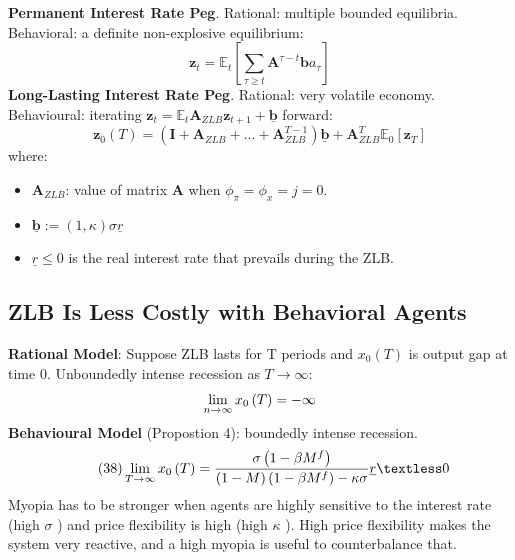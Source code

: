 \documentclass{beamer}
\begin{document}
\begin{frame}{\subsecname}
    \textbf{Permanent Interest Rate Peg}. Rational: multiple bounded equilibria. Behavioral: a definite non-explosive equilibrium:
    \begin{equation}\tag{36}
        \textbf{z}_{t}=\mathbb{E}_{t}\left[\sum_{\tau \geq t}\textbf{A}^{\tau-t}\textbf{b}a_{\tau}\right]
    \end{equation}
    \textbf{Long-Lasting Interest Rate Peg}. Rational: very volatile economy. Behavioural: iterating $\textbf{z}_{t}=\mathbb{E}_{t}\textbf{A}_{ZLB}\textbf{z}_{t+1}+\underline{\textbf{b}}$ forward:
    \begin{equation}\tag{37}
        \textbf{z}_{0}(T)=\left(\textbf{I}+\textbf{A}_{ZLB}+...+\textbf{A}_{ZLB}^{T-1}\right)\underline{\textbf{b}}+\textbf{A}_{ZLB}^{T}\mathbb{E}_{0}\left[\textbf{z}_{T}\right]
    \end{equation}
    where:
    \begin{itemize}
        \item $\textbf{A}_{ZLB}$: value of matrix $\textbf{A}$  when $\phi_{\pi}=\phi_{x}=j=0$.
        \item $\underline{\textbf{b}}:=\left(1,\kappa\right)\sigma\underline{r}$
        \item $\underline{r}\leq 0$ is the real interest rate that prevails during the ZLB.
    \end{itemize}
\end{frame}

\subsection{ZLB Is Less Costly with Behavioral Agents}

\begin{frame}{\subsecname}
    \textbf{Rational Model}: Suppose ZLB lasts for T periods and $x_{0}\left(T\right)$ is output gap at time 0. Unboundedly intense recession as $T\to\infty$:
    \begin{equation}\notag
        \lim\limits_{n\to\infty}x_{0}\left(T\right)=-\infty
    \end{equation}
    \textbf{Behavioural Model} (Propostion 4): boundedly intense recession.
    \begin{equation}\tag{38}    \lim\limits_{T\to\infty}x_{0}\left(T\right)=\frac{\sigma\left(1-\beta M^{f}\right)}{\left(1-M\right)\left(1-\beta M^{f}\right)-\kappa\sigma}\underline{r}\textless 0
    \end{equation}
    Myopia has to be stronger when agents are highly sensitive to the interest rate (high $\sigma$ ) and price flexibility is high (high $\kappa$ ). High price flexibility makes the system very reactive, and a high myopia is useful to counterbalance that.
\end{frame}
\end{document}
